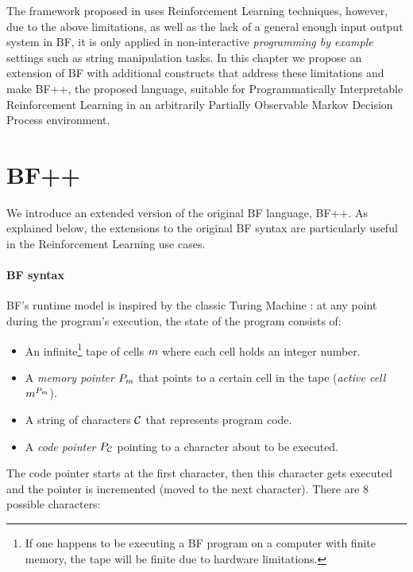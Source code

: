 The framework proposed in \cite{abolafiaNeuralProgramSynthesis2018} uses Reinforcement Learning techniques, however, due to the above limitations, as well as the lack of a general enough input output system in BF, it is only applied in non-interactive \emph{programming by example} settings such as string manipulation tasks.
In this chapter we propose an extension of BF with additional constructs that address these limitations and make BF++, the proposed language, suitable for Programmatically Interpretable Reinforcement Learning in an arbitrarily Partially Observable Markov Decision Process environment.

\newpage
\section{BF++}
\label{sec:language}

We introduce an extended version of the original BF language, BF++. 
As explained below, the extensions to the original BF syntax are particularly useful in the Reinforcement Learning use cases. 

\paragraph{BF syntax}
\label{sec:bf}

BF's runtime model is inspired by the classic Turing Machine \cite{turing}: at any point during the program's execution, the state of the program consists of:

\begin{itemize}
    \item An infinite\footnote{If one happens to be executing a BF program on a computer with finite memory, the tape will be finite due to hardware limitations.} tape of cells $m$ where each cell holds an integer number.
    \item A \textit{memory pointer} $P_m$ that points to a certain cell in the tape (\textit{active cell} $m^{P_m}$).
    \item A string of characters $\mathcal{C}$ that represents program code.
    \item A \textit{code pointer} $P_{\mathcal{C}}$ pointing to a character about to be executed.
\end{itemize}

The code pointer starts at the first character, then this character gets executed and the pointer is incremented (moved to the next character).
There are 8 possible characters:

